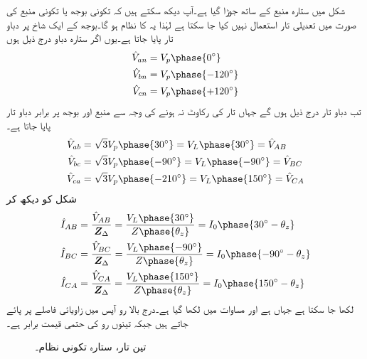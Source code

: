 شکل  میں ستارہ منبع کے ساتھ  جوڑا گیا ہے۔آپ دیکھ سکتے ہیں کہ تکونی بوجھ یا تکونی منبع کی صورت میں تعدیلی تار استعمال نہیں کیا جا سکتا ہے لہٰذا یہ  کا نظام ہو گا۔بوجھ کے ایک شاخ پر دباو تار پایا جاتا ہے۔یوں اگر ستارہ دباو درج ذیل ہوں
\begin{align*}
\hat{V}_{an}&=V_p\phase{0^{\circ}}\\
\hat{V}_{bn}&=V_p\phase{-120^{\circ}}\\
\hat{V}_{cn}&=V_p\phase{+120^{\circ}}
\end{align*}
تب دباو تار درج ذیل ہوں گے جہاں تار کی رکاوٹ نہ ہونے کی وجہ سے منبع اور بوجھ پر برابر دباو تار پایا جاتا ہے۔
\begin{align*}
\hat{V}_{ab}&=\sqrt{3}V_p\phase{30^{\circ}}=V_L\phase{30^{\circ}}=\hat{V}_{AB}\\
\hat{V}_{bc}&=\sqrt{3}V_p\phase{-90^{\circ}}=V_L\phase{-90^{\circ}}=\hat{V}_{BC}\\
\hat{V}_{ca}&=\sqrt{3}V_p\phase{-210^{\circ}}=V_L\phase{150^{\circ}}=\hat{V}_{CA}
\end{align*}
شکل  کو دیکھ کر 
\begin{align*}
\hat{I}_{AB}&=\frac{\hat{V}_{AB}}{\bZ_{\Delta}}=\frac{V_L\phase{30^{\circ}}}{Z\phase{\theta_z}}=I_0\phase{30^{\circ}-\theta_z}\\
\hat{I}_{BC}&=\frac{\hat{V}_{BC}}{\bZ_{\Delta}}=\frac{V_L\phase{-90^{\circ}}}{Z\phase{\theta_z}}=I_0\phase{-90^{\circ}-\theta_z}\\
\hat{I}_{CA}&=\frac{\hat{V}_{CA}}{\bZ_{\Delta}}=\frac{V_L\phase{150^{\circ}}}{Z\phase{\theta_z}}=I_0\phase{150^{\circ}-\theta_z}
\end{align*}
لکھا جا سکتا ہے جہاں  ہے اور مساوات میں  لکھا گیا ہے۔درج بالا رو آپس میں  زاویائی فاصلے پر پائے جاتے ہیں جبکہ تینوں رو کی حتمی قیمت برابر ہے۔
\begin{figure}
\centering
{}
\caption{تین تار، ستارہ تکونی نظام۔}
\label{شکل_تین_دوری_ستارہ_تکونی_الف}
\end{figure}
